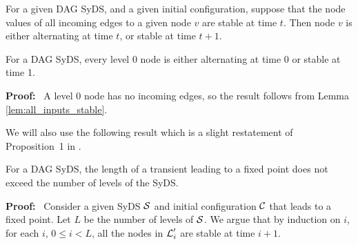 \smallskip

\begin{lemma}\label{lem:all_inputs_stable}
For a given DAG SyDS, and a given initial configuration, suppose
that the node values of all incoming edges to a given node $v$ are
stable at time $t$.  Then node $v$ is either alternating at time
$t$, or stable at time $t+1$.
\end{lemma}

\iffalse
\noindent
\textbf{Proof:}~ 
Given the stable value of each incoming variable, the local transition
function for node $v$ at any time $t'$, where $t' \geq t$ is a
function of only one variable: the self variable $v$.  The only
possible functions of a single variable are a constant function,
the identity function, or the complement function.  If the local
transition function for $v$ is a constant function, then the value
of $v$ can possibly change between $t$ and $t+1$, but for any $t'
\geq t+1$, remains unchanged.  If the local transition function for
$v$ is the identity function, then the value of $v$ never changes
from its value at time $t$.  If the local transition function for
$v$ is the complement function, then the value of $v$ alternates
between complementary values.  \QED
\fi

\begin{lemma}\label{lem:level_zero_nodes}
For a DAG SyDS, every level 0 node is either 
alternating at time 0 or stable at time 1.
\end{lemma}
\noindent
\textbf{Proof:}~ 
 A level 0 node has no incoming edges,
so the result follows from Lemma \ref{lem:all_inputs_stable}.  \QED

We will also use the following result which is a slight restatement
of Proposition~1 in \cite{Chistikov-etal-2020}.


\begin{proposition}\label{pro:transient_fixed_point}
For a DAG SyDS,
the length of a transient leading to a fixed point does not 
exceed the number of levels of the SyDS.
\end{proposition}

\iffalse
\noindent
\textbf{Proof:}~ 
Consider a given SyDS $\mbox{$\mathcal{S}$}$ and initial configuration $\mbox{$\mathcal{C}$}$ that leads to a fixed point.
Let $L$ be the number of levels of $\mbox{$\mathcal{S}$}$.
We argue that by induction on $i$, for each $i$, $0 \leq i < L$,
all the nodes in $\mbox{$\mathcal{L}$}_i'$ are stable at time $i+1$.

